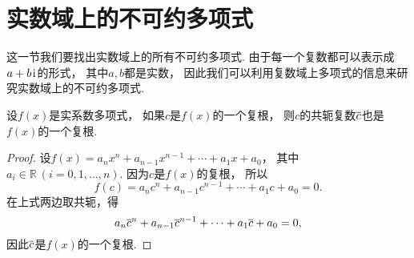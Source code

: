 \section{实数域上的不可约多项式}
这一节我们要找出实数域上的所有不可约多项式.
由于每一个复数都可以表示成\(a+b\kern1pt\mathrm{i}\kern1pt\)的形式，
其中\(a,b\)都是实数，
因此我们可以利用复数域上多项式的信息来研究实数域上的不可约多项式.

\begin{theorem}\label{theorem:实数域上的不可约多项式.多项式的复根的共轭也是根}
设\(f(x)\)是实系数多项式，
如果\(c\)是\(f(x)\)的一个复根，
则\(c\)的共轭复数\(\overline{c}\)也是\(f(x)\)的一个复根.
\begin{proof}
设\(f(x)=a_n x^n+a_{n-1} x^{n-1}+\dotsb+a_1 x+a_0\)，
其中\(a_i\in\mathbb{R}\ (i=0,1,\dotsc,n)\).
因为\(c\)是\(f(x)\)的复根，
所以\begin{equation*}
	f(c)=a_n c^n+a_{n-1} c^{n-1}+\dotsb+a_1 c+a_0=0.
\end{equation*}
在上式两边取共轭，得\begin{equation*}
	a_n \overline{c}^n+a_{n-1} \overline{c}^{n-1}+\dotsb+a_1 \overline{c}+a_0=0,
\end{equation*}
因此\(\overline{c}\)是\(f(x)\)的一个复根.
\end{proof}
\end{theorem}

